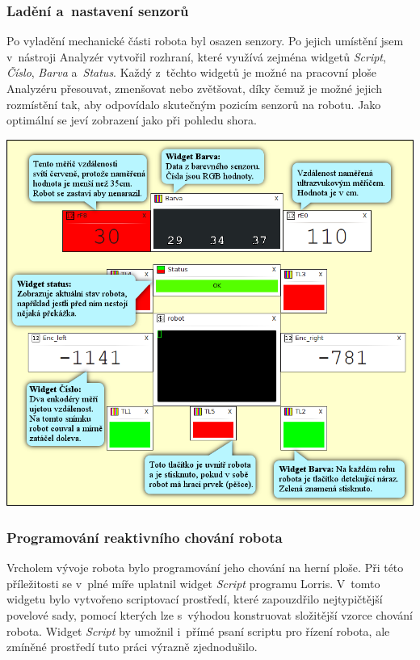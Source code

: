 \documentclass[12pt, a4paper, oneside]{article}
\newcommand{\It}{\textit}  %
\begin{document}
\subsubsection{Ladění a~nastavení senzorů}
Po vyladění mechanické části robota byl osazen senzory. Po jejich umístění jsem v~nástroji Analyzér vytvořil rozhraní, které využívá zejména widgetů \It{Script}, \It{Číslo}, \It{Barva} a~\It{Status}. Každý z~těchto widgetů je možné na pracovní ploše Analyzéru přesouvat, zmenšovat nebo zvětšovat, díky čemuž je možné jejich rozmístění tak, aby odpovídalo skutečným pozicím senzorů na robotu. Jako optimální se jeví zobrazení jako při pohledu shora.
\vspace{10mm}
\begin{center}
\includegraphics[width=\textwidth]{img/sensors_david.png}
\end{center}

\newpage
\subsubsection{Programování reaktivního chování robota}
Vrcholem vývoje robota bylo programování jeho chování na herní ploše. Při této příležitosti se v~plné míře uplatnil widget \It{Script} programu Lorris. V~tomto widgetu bylo vytvořeno scriptovací prostředí, které zapouzdřilo nejtypičtější povelové sady, pomocí kterých lze s~výhodou konstruovat složitější vzorce chování robota. Widget \It{Script} by umožnil i~přímé psaní scriptu pro řízení robota, ale zmíněné prostředí tuto práci výrazně zjednodušilo.
\end{document}
